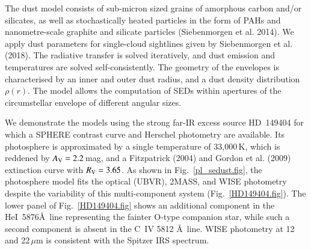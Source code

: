 \documentclass[tradiabstract]{aa} %
\begin{document}
The dust model consists of sub-micron sized grains of amorphous carbon
and/or silicates, as well as stochastically heated particles in the
form of PAHs and nanometre-scale graphite { and silicate} particles
(Siebenmorgen et al. 2014). { We apply dust parameters for
  single-cloud sightlines given by Siebenmorgen et al. (2018). } The
radiative transfer is solved iteratively, and dust emission and
temperatures are solved self-consistently. The geometry of the
envelopes is characterised by an inner and outer dust radius, and a
dust density distribution $\rho(r)$.  The model allows the computation
of SEDs within apertures of the
circumstellar envelope of different angular sizes.


We demonstrate the models using the strong far-IR excess source HD~149404
for which a SPHERE contrast curve and Herschel photometry are
available. Its photosphere is approximated by a single temperature of
33,000\,K, which is reddened by $A_{\rm {V}} = 2.2$\,mag, and a
Fitzpatrick (2004) and Gordon et al. (2009) extinction curve with $R_{\rm
  {V}} = 3.65$. As shown in Fig.~\ref{pl_sedust.fig}, the photosphere
model fits the optical (UBVR), 2MASS, and WISE photometry despite the
variability of this multi-component system
(Fig.~\ref{HD149404.fig}). The lower panel of Fig.~\ref{HD149404.fig}
shows an additional component in the HeI~5876\AA\ line representing
the fainter O-type companion star, while{ such a second component
  is absent in the C~IV 5812 \AA\ line.} WISE photometry at 12 and
22\,$\mu$m is consistent with the Spitzer IRS spectrum.
\end{document}
